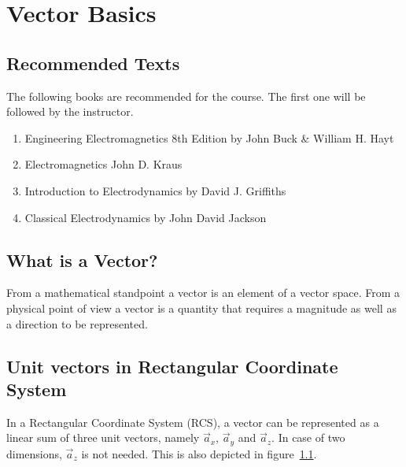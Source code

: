 \chapter{Vector Basics}
    \section{Recommended Texts}
        The following books are recommended for the course. The first one will be followed by the instructor.
        \begin{enumerate}
            \item Engineering Electromagnetics 8th Edition by John Buck \& William H. Hayt
            \item Electromagnetics John D. Kraus
            \item Introduction to Electrodynamics by David J. Griffiths
            \item Classical Electrodynamics by John David Jackson
        \end{enumerate}
    \section{What is a Vector?}
        From a mathematical standpoint a vector is an element of a vector space. From a physical point of view a vector is a quantity that requires a magnitude as well as a direction to be represented.
    \section{Unit vectors in Rectangular Coordinate System}
        In a Rectangular Coordinate System (RCS), a vector can be represented as a linear sum of three unit vectors, namely $\vec{a}_x$, $\vec{a}_y$ and $\vec{a}_z$. In case of two dimensions, $\vec{a}_z$ is not needed. This is also depicted in figure~\ref{fig:vectors}.
        \begin{figure}
            \centering
            \caption{}
            \label{fig:vectors}
        \end{figure}
